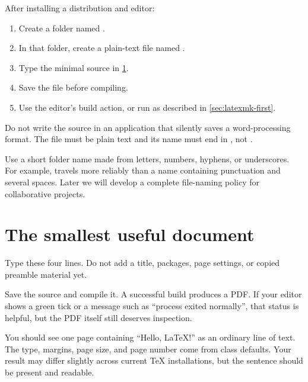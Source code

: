 After installing a distribution and editor:

\begin{enumerate}
  \item Create a folder named .
  \item In that folder, create a plain-text file named .
  \item Type the minimal source in \cref{sec:minimal-document}.
  \item Save the file before compiling.
  \item Use the editor's build action, or run  as described in
        \cref{sec:latexmk-first}.
\end{enumerate}

Do not write the source in an application that silently saves a word-processing
format. The file must be plain text and its name must end in , not
.

\begin{goodpractice}
Use a short folder name made from letters, numbers, hyphens, or underscores.
For example,  travels more reliably than a name
containing punctuation and several spaces. Later we will develop a complete
file-naming policy for collaborative projects.
\end{goodpractice}

\section{The smallest useful document}
\label{sec:minimal-document}

Type these four lines. Do not add a title, packages, page settings, or copied
preamble material yet.


Save the source and compile it. A successful build produces a PDF. If your
editor shows a green tick or a message such as ``process exited normally'',
that status is helpful, but the PDF itself still deserves inspection.

\expectedoutput

You should see one page containing ``Hello, \LaTeX{}!'' as an ordinary line of
text. The type, margins, page size, and page number come from class defaults.
Your result may differ slightly across current TeX installations, but the
sentence should be present and readable.

